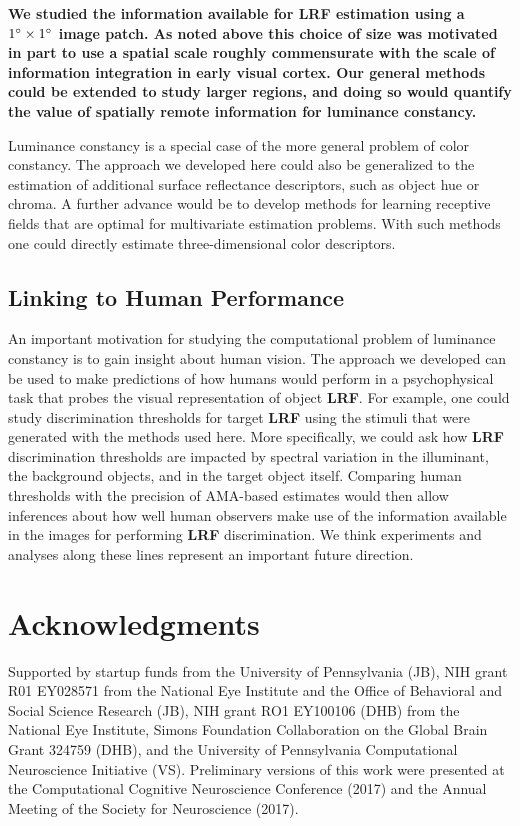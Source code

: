\documentclass{jov}
\providecommand{\DIFaddtex}[1]{{\bf #1}} %
\providecommand{\DIFdeltex}[1]{} %
\providecommand{\DIFaddbegin}{} %
\providecommand{\DIFaddend}{} %
\providecommand{\DIFdelbegin}{} %
\providecommand{\DIFdelend}{} %
\providecommand{\DIFadd}[1]{\texorpdfstring{\DIFaddtex{#1}}{#1}} %
\providecommand{\DIFdel}[1]{\texorpdfstring{\DIFdeltex{#1}}{}} %
\newcommand{\DIFscaledelfig}{0.5}
\newlength{\DIFdelgraphicswidth} %
\newlength{\DIFdelgraphicsheight} %
\newcommand{\DIFaddincludegraphics}[2][]{{\color{blue}\fbox{\DIFOincludegraphics[#1]{#2}}}} %
\newcommand{\DIFdelincludegraphics}[2][]{%
\sbox{\DIFdelgraphicsbox}{\DIFOincludegraphics[#1]{#2}}%
\settoboxwidth{\DIFdelgraphicswidth}{\DIFdelgraphicsbox} %
\settoboxtotalheight{\DIFdelgraphicsheight}{\DIFdelgraphicsbox} %
\scalebox{\DIFscaledelfig}{%
\parbox[b]{\DIFdelgraphicswidth}{\usebox{\DIFdelgraphicsbox}\\[-\baselineskip] \rule{\DIFdelgraphicswidth}{0em}}\llap{\resizebox{\DIFdelgraphicswidth}{\DIFdelgraphicsheight}{%
\setlength{\unitlength}{\DIFdelgraphicswidth}%
\begin{picture}(1,1)%
\thicklines\linethickness{2pt} %
{\color[rgb]{1,0,0}\put(0,0){\framebox(1,1){}}}%
{\color[rgb]{1,0,0}\put(0,0){\line( 1,1){1}}}%
{\color[rgb]{1,0,0}\put(0,1){\line(1,-1){1}}}%
\end{picture}%
}\hspace*{3pt}}} %
} %
\DeclareRobustCommand{\DIFaddbegin}{\DIFOaddbegin \let\includegraphics\DIFaddincludegraphics} %
\DeclareRobustCommand{\DIFaddend}{\DIFOaddend \let\includegraphics\DIFOincludegraphics} %
\DeclareRobustCommand{\DIFdelbegin}{\DIFOdelbegin \let\includegraphics\DIFdelincludegraphics} %
\DeclareRobustCommand{\DIFdelend}{\DIFOaddend \let\includegraphics\DIFOincludegraphics} %
\begin{document}
\DIFaddbegin \DIFadd{We studied the information available for LRF estimation using a $1\degree \times 1 \degree$ image patch. As noted above this choice of size was motivated in part to use a spatial scale roughly commensurate with the scale of information integration in early visual cortex. Our general methods could be extended to study larger regions, and doing so would quantify the value of spatially remote information for luminance constancy. 
}

\DIFaddend Luminance constancy is a special case of the more general problem of color constancy.
The approach we developed here could also be generalized to the estimation of additional surface reflectance descriptors, such as object hue or chroma.
A further advance would be to develop methods for learning receptive fields that are optimal for multivariate estimation problems. 
With such methods one could directly estimate three-dimensional color descriptors.

\subsection{Linking to Human Performance}

An important motivation for studying the computational problem of luminance constancy is to gain insight about human vision.
The approach we developed can be used to make predictions of how humans would perform in a psychophysical task that probes the visual representation of object \DIFdelbegin \DIFdel{LRV}\DIFdelend \DIFaddbegin \DIFadd{LRF}\DIFaddend .
For example, one could study discrimination thresholds for target \DIFdelbegin \DIFdel{LRV }\DIFdelend \DIFaddbegin \DIFadd{LRF }\DIFaddend using the stimuli that were generated with the methods used here.
More specifically, we could ask how \DIFdelbegin \DIFdel{LRV }\DIFdelend \DIFaddbegin \DIFadd{LRF }\DIFaddend discrimination thresholds are impacted by spectral variation in the illuminant, the background objects, and in the target object itself.
Comparing human thresholds with the precision of AMA-based estimates would then allow inferences about how well human observers make use of the information available in the images for performing \DIFdelbegin \DIFdel{LRV }\DIFdelend \DIFaddbegin \DIFadd{LRF }\DIFaddend discrimination.
We think experiments and analyses along these lines represent an important future direction.

\section{Acknowledgments} \label{Acknowledgments}

Supported by startup funds from the University of Pennsylvania (JB), NIH grant R01 EY028571 from the National Eye Institute and the Office of Behavioral and Social Science Research (JB), NIH grant RO1 EY100106 (DHB) from the National Eye Institute, Simons Foundation Collaboration on the Global Brain Grant 324759 (DHB), and the University of Pennsylvania Computational Neuroscience Initiative (VS).  Preliminary versions of this work were presented at the Computational Cognitive Neuroscience Conference (2017) and the Annual Meeting of the Society for Neuroscience (2017).



\end{document}
